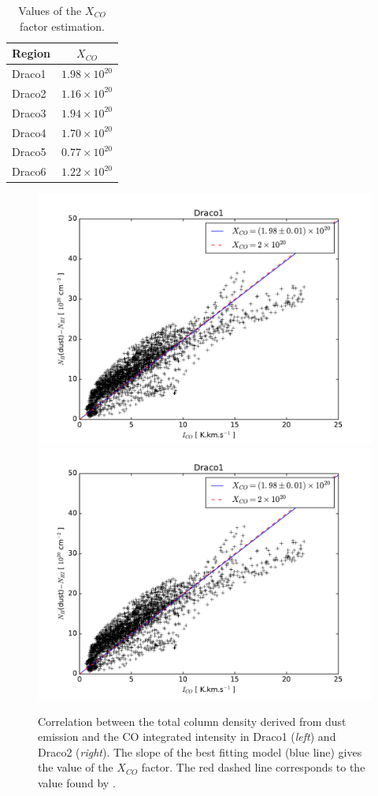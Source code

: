 \documentclass[traditabstract]{aa}
\begin{document}
\begin{table}[h]
  \centering
  \footnotesize
  \caption{\label{table:Xco} Values of the $X_{CO}$ factor estimation.}
  \begin{tabular}{lc}
    \hline \hline
    Region &       $X_{CO}$       \\ \hline 
    Draco1 & $1.98\times 10^{20}$ \\
    Draco2 & $1.16\times 10^{20}$ \\
    Draco3 & $1.94\times 10^{20}$ \\
    Draco4 & $1.70\times 10^{20}$ \\
    Draco5 & $0.77\times 10^{20}$ \\
    Draco6 & $1.22\times 10^{20}$ \\ \hline
  \end{tabular}
\end{table}

\begin{figure}[h!]
  \centering
  \includegraphics[page=1,width=0.48\linewidth,trim=30 10 50 30,clip=true]{Figures/dust-CO_comparison.pdf}
  \hspace{3mm}
  \includegraphics[page=2,width=0.48\linewidth,trim=30 10 50 30,clip=true]{Figures/dust-CO_comparison.pdf}
  \caption{\label{Xco} Correlation between the total column density derived from dust emission and the CO integrated intensity in Draco1 (\emph{left}) and Draco2 (\emph{right}). The slope of the best fitting model (blue line) gives the value of the $X_{CO}$ factor. The red dashed line corresponds to the value found by \cite{Moritz_1998}.}
\end{figure}
\end{document}
